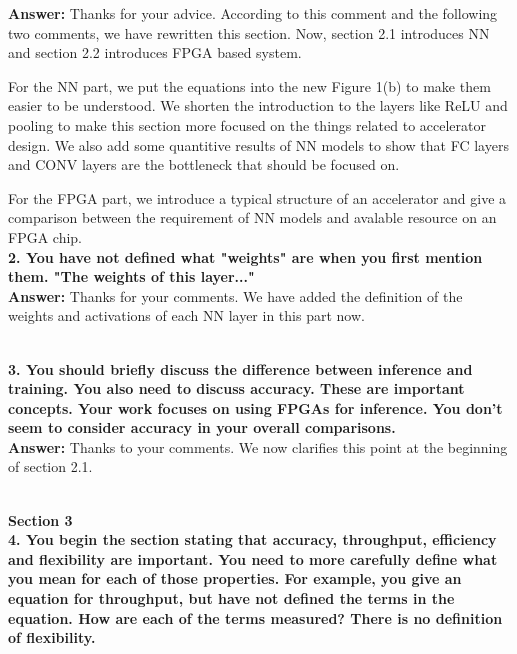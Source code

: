 \documentclass[12pt]{paper}
\newcommand{\rev}[1]{{{\color[rgb]{0,0,1}{#1}}}}
\newcommand{\answer}[1]{\noindent\textbf{Answer:} #1\\}
\newcommand{\comment}[1]{\noindent\textbf{#1}\\}
\begin{document}
\answer{Thanks for your advice. According to this comment and the following two comments, we have rewritten this section. Now, section 2.1 introduces NN and section 2.2 introduces FPGA based system. 

For the NN part, we put the equations into the new Figure 1(b) to make them easier to be understood. We shorten the introduction to the layers like ReLU and pooling to make this section more focused on the things related to accelerator design. We also add some quantitive results of NN models to show that FC layers and CONV layers are the bottleneck that should be focused on.

For the FPGA part, we introduce a typical structure of an accelerator and give a comparison between the requirement of NN models and avalable resource on an FPGA chip. }

\comment{2. You have not defined what "weights" are when you first mention them.  "The weights of this layer..."}

\answer{Thanks for your comments. We have added the definition of the weights and activations of each NN layer in this part now. 

\rev{We refer the parameter of each layer as weights and the input/output of each layer as activations through this paper.}}

\comment{3. You should briefly discuss the difference between inference and training. You also need to discuss accuracy. These are important concepts. Your work focuses on using FPGAs for inference. You don't seem to consider accuracy in your overall comparisons.}

\answer{Thanks to your comments. We now clarifies this point at the beginning of section 2.1. 

\rev{In this paper, we only focus on the inference of NN, which means using a trained model to predict or classify new data. The training process of NN is not discussed in this paper.}}

{\noindent\textbf{Section 3}}\\

\comment{4. You begin the section stating that accuracy, throughput, efficiency and flexibility are important. You need to more carefully define what you mean for each of those properties.  For example, you give an equation for throughput, but have not defined the terms in the equation.  How are each of the terms measured? There is no definition of flexibility.}
\end{document}
